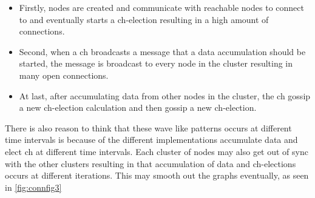 \documentclass[USenglish]{uit-thesis}
\begin{document}
\begin{itemize}
\item Firstly, nodes are created and communicate with reachable nodes to connect to and eventually starts a \gls{ch}-election resulting in a high amount of connections.
\item Second, when a \gls{ch} broadcasts a message that a data accumulation should be started, the message is broadcast to every node in the cluster resulting in many open connections.
\item At last, after accumulating data from other nodes in the cluster, the \gls{ch} gossip a new \gls{ch}-election calculation and then gossip a new \gls{ch}-election.
\end{itemize}


There is also reason to think that these wave like patterns occurs at different time intervals is because of the different implementations accumulate data and elect \gls{ch} at different time intervals. Each cluster of nodes may also get out of sync with the other clusters resulting in that accumulation of data and \gls{ch}-elections occurs at different iterations. This may smooth out the graphs eventually, as seen in \autoref{fig:connfig3}


\end{document}
